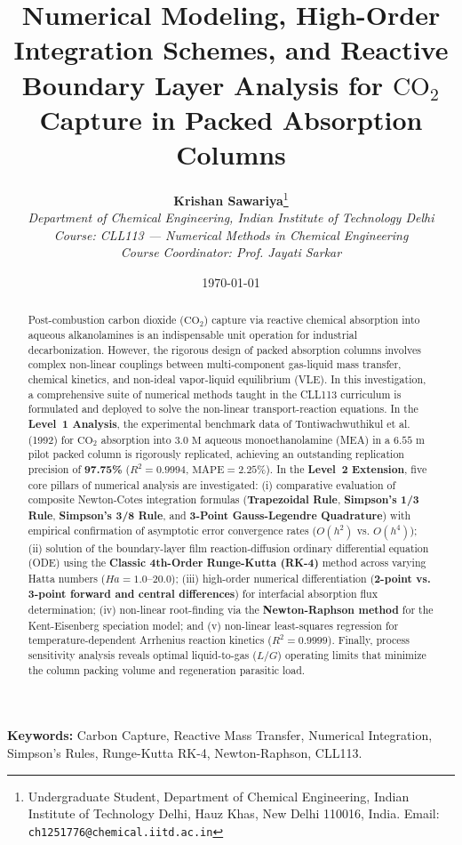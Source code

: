 \documentclass[11pt,a4paper]{article}
\title{\textbf{\Large Numerical Modeling, High-Order Integration Schemes, and Reactive Boundary Layer Analysis for $\text{CO}_2$ Capture in Packed Absorption Columns}}
\author{
    \textbf{Krishan Sawariya}\footnote{Undergraduate Student, Department of Chemical Engineering, Indian Institute of Technology Delhi, Hauz Khas, New Delhi 110016, India. Email: \texttt{ch1251776@chemical.iitd.ac.in}} \\[0.5em]
    \textit{Department of Chemical Engineering, Indian Institute of Technology Delhi} \\[0.3em]
    \textit{Course: CLL113 --- Numerical Methods in Chemical Engineering} \\[0.2em]
    \textit{Course Coordinator: Prof. Jayati Sarkar}
}
\date{\today}
\begin{document}
\maketitle

\begin{abstract}
Post-combustion carbon dioxide ($\text{CO}_2$) capture via reactive chemical absorption into aqueous alkanolamines is an indispensable unit operation for industrial decarbonization. However, the rigorous design of packed absorption columns involves complex non-linear couplings between multi-component gas-liquid mass transfer, chemical kinetics, and non-ideal vapor-liquid equilibrium (VLE). In this investigation, a comprehensive suite of numerical methods taught in the CLL113 curriculum is formulated and deployed to solve the non-linear transport-reaction equations. In the \textbf{Level~1 Analysis}, the experimental benchmark data of Tontiwachwuthikul et al. (1992) for $\text{CO}_2$ absorption into $3.0\text{ M}$ aqueous monoethanolamine (MEA) in a $6.55\text{ m}$ pilot packed column is rigorously replicated, achieving an outstanding replication precision of \textbf{97.75\%} ($R^2 = 0.9994$, $\text{MAPE} = 2.25\%$). In the \textbf{Level~2 Extension}, five core pillars of numerical analysis are investigated: (i) comparative evaluation of composite Newton-Cotes integration formulas (\textbf{Trapezoidal Rule}, \textbf{Simpson's 1/3 Rule}, \textbf{Simpson's 3/8 Rule}, and \textbf{3-Point Gauss-Legendre Quadrature}) with empirical confirmation of asymptotic error convergence rates ($O(h^2)$ vs. $O(h^4)$); (ii) solution of the boundary-layer film reaction-diffusion ordinary differential equation (ODE) using the \textbf{Classic 4th-Order Runge-Kutta (RK-4)} method across varying Hatta numbers ($Ha = 1.0\text{--}20.0$); (iii) high-order numerical differentiation (\textbf{2-point vs. 3-point forward and central differences}) for interfacial absorption flux determination; (iv) non-linear root-finding via the \textbf{Newton-Raphson method} for the Kent-Eisenberg speciation model; and (v) non-linear least-squares regression for temperature-dependent Arrhenius reaction kinetics ($R^2 = 0.9999$). Finally, process sensitivity analysis reveals optimal liquid-to-gas ($L/G$) operating limits that minimize the column packing volume and regeneration parasitic load.
\end{abstract}

\vspace{0.5em}
\noindent\textbf{Keywords:} Carbon Capture, Reactive Mass Transfer, Numerical Integration, Simpson's Rules, Runge-Kutta RK-4, Newton-Raphson, CLL113.
\end{document}
